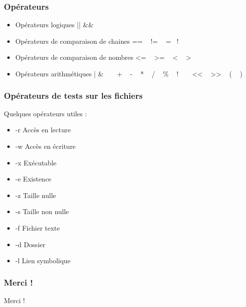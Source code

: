 \documentclass[handout,10pt]{beamer}
\begin{document}
\frame
{
    \frametitle{Opérateurs}

    \begin{itemize}
        \item Opérateurs logiques {\ttfamily ||  \&\&  }
        \item Opérateurs de comparaison de chaines {\ttfamily  == ~ != ~ =\tild ~ !\tild }
        \item Opérateurs de comparaison de nombres {\ttfamily <= ~  >= ~ < ~ > }
        \item Opérateurs arithmétiques {\ttfamily  |  \& ~ \circonflexe ~ + ~ - ~ * ~ / ~ \%  ~ ! ~ \tild ~ << ~ >> ~ ( ~ ) }
    \end{itemize}
}


\frame
{
    \frametitle{Opérateurs de tests sur les fichiers}

    Quelques opérateurs utiles :

    \begin{itemize}
        \item {\ttfamily -r}   Accès en lecture
        \item {\ttfamily -w}   Accès en écriture
        \item {\ttfamily -x}   Exécutable
        \item {\ttfamily -e}   Existence
        \item {\ttfamily -z}   Taille nulle
        \item {\ttfamily -s}   Taille non nulle
        \item {\ttfamily -f}   Fichier texte
        \item {\ttfamily -d}   Dossier
        \item {\ttfamily -l}   Lien symbolique
    \end{itemize}
}

\frame
{
    \frametitle{Merci !}

    Merci !

}
\end{document}
